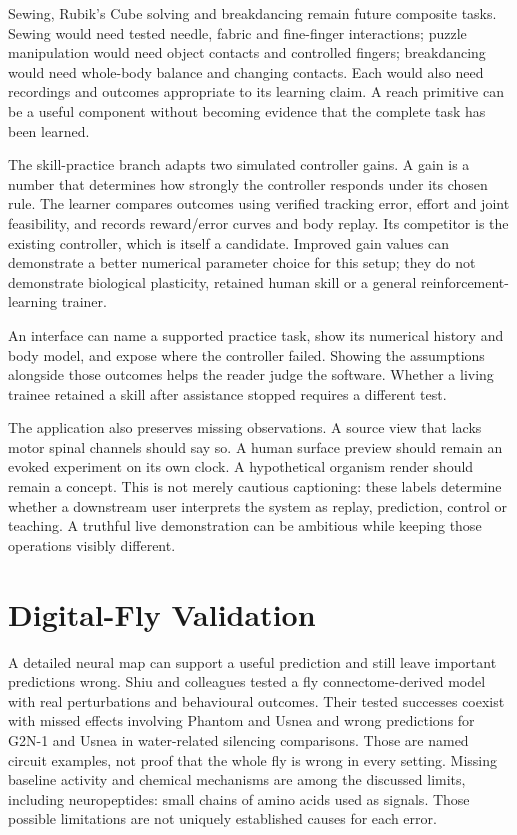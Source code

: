 Sewing, Rubik's Cube solving and breakdancing remain future composite tasks. Sewing would need tested needle, fabric and fine-finger interactions; puzzle manipulation would need object contacts and controlled fingers; breakdancing would need whole-body balance and changing contacts. Each would also need recordings and outcomes appropriate to its learning claim. A reach primitive can be a useful component without becoming evidence that the complete task has been learned.

The skill-practice branch adapts two simulated controller gains. A gain is a number that determines how strongly the controller responds under its chosen rule. The learner compares outcomes using verified tracking error, effort and joint feasibility, and records reward/error curves and body replay. Its competitor is the existing controller, which is itself a candidate. Improved gain values can demonstrate a better numerical parameter choice for this setup; they do not demonstrate biological plasticity, retained human skill or a general reinforcement-learning trainer.

An interface can name a supported practice task, show its numerical history and body model, and expose where the controller failed. Showing the assumptions alongside those outcomes helps the reader judge the software. Whether a living trainee retained a skill after assistance stopped requires a different test.

The application also preserves missing observations. A source view that lacks motor spinal channels should say so. A human surface preview should remain an evoked experiment on its own clock. A hypothetical organism render should remain a concept. This is not merely cautious captioning: these labels determine whether a downstream user interprets the system as replay, prediction, control or teaching. A truthful live demonstration can be ambitious while keeping those operations visibly different.

\section{Digital-Fly Validation}

A detailed neural map can support a useful prediction and still leave important
predictions wrong. Shiu and colleagues tested a fly connectome-derived model
with real perturbations and behavioural outcomes. Their tested successes
coexist with missed effects involving Phantom and Usnea and wrong predictions
for G2N-1 and Usnea in water-related silencing comparisons. Those are named
circuit examples, not proof that the whole fly is wrong in every setting.
Missing baseline activity and chemical mechanisms are among the discussed
limits, including neuropeptides: small chains of amino acids used as signals.
Those possible limitations are not uniquely established causes for each error.\cite{shiu2024}

